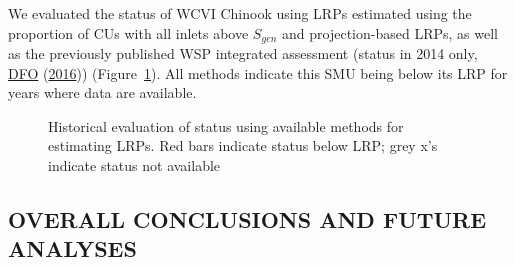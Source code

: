\documentclass[11pt]{book}
\begin{document}
We evaluated the status of WCVI Chinook using LRPs estimated using the proportion of CUs with all inlets above \(S_{gen}\) and projection-based LRPs, as well as the previously published WSP integrated assessment (status in 2014 only, \protect\hyperlink{ref-dfoIntegratedBiologicalStatus2016}{DFO} (\protect\hyperlink{ref-dfoIntegratedBiologicalStatus2016}{2016})) (Figure~\ref{fig:chinook-retro}). All methods indicate this SMU being below its LRP for years where data are available.
\begin{figure}[htb]

{\centering {} 

}

\caption{Historical evaluation of status using available methods for estimating LRPs. Red bars indicate status below LRP; grey x's indicate status not available}\label{fig:chinook-retro}
\end{figure}
\hypertarget{overall-conclusions-and-future-analyses}{%
\subsection{OVERALL CONCLUSIONS AND FUTURE ANALYSES}\label{overall-conclusions-and-future-analyses}}
\end{document}
